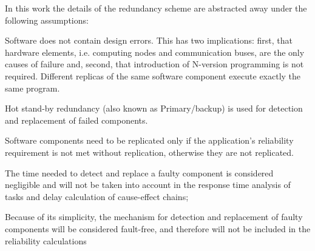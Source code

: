 {{%


In this work the details of the redundancy scheme are abstracted away under the following assumptions:
\begin{enumerate*}[label=(\roman*)]
    \item Software does not contain design errors. This has two implications: first, that hardware elements, i.e. computing nodes and communication buses, are the only causes of failure and, second, that introduction of N-version programming is not required. Different replicas of the same software component execute exactly the same program.
	\item Hot stand-by redundancy (also known as Primary/backup) is used for detection and replacement of failed components.
	\item Software components need to be replicated only if the application's reliability requirement is not met without replication, otherwise they are not replicated.
	\item The time needed to detect and replace a faulty component is considered negligible and will not be taken into account in the response time analysis of tasks and delay calculation of cause-effect chains;
	\item Because of its simplicity, the mechanism for detection and replacement of faulty components will be considered fault-free, and therefore will not be included in the reliability calculations
\end{enumerate*}

}}
